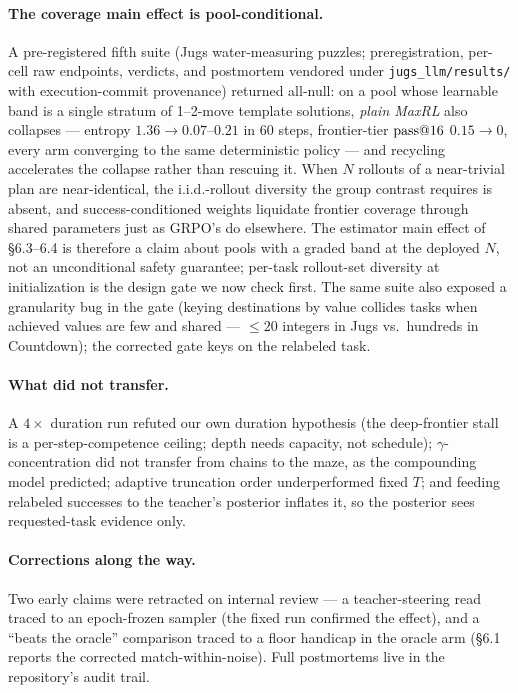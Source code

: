 \paragraph{The coverage main effect is pool-conditional.} A
pre-registered fifth suite (Jugs water-measuring puzzles;
preregistration, per-cell raw endpoints, verdicts, and postmortem
vendored under \texttt{jugs\_llm/results/} with execution-commit
provenance) returned all-null: on a pool whose
learnable band is a single stratum of 1--2-move template solutions,
\emph{plain MaxRL} also collapses --- entropy $1.36 \to 0.07$--$0.21$
in 60 steps, frontier-tier $\text{pass@}16$ $0.15 \to 0$, every arm
converging to the same deterministic policy --- and recycling
accelerates the collapse rather than rescuing it. When $N$ rollouts of
a near-trivial plan are near-identical, the i.i.d.-rollout diversity
the group contrast requires is absent, and success-conditioned weights
liquidate frontier coverage through shared parameters just as GRPO's
do elsewhere. The estimator main effect of \S 6.3--6.4 is therefore a
claim about pools with a graded band at the deployed $N$, not an
unconditional safety guarantee; per-task rollout-set diversity at
initialization is the design gate we now check first. The same suite
also exposed a granularity bug in the gate (keying destinations by
value collides tasks when achieved values are few and shared ---
$\le 20$ integers in Jugs vs.\ hundreds in Countdown); the corrected
gate keys on the relabeled task.

\paragraph{What did not transfer.} A $4\times$ duration run refuted
our own duration hypothesis (the deep-frontier stall is a
per-step-competence ceiling; depth needs capacity, not schedule);
$\gamma$-concentration did not transfer from chains to the maze,
as the compounding model predicted; adaptive truncation order
underperformed fixed $T$; and feeding relabeled successes to the
teacher's posterior inflates it, so the posterior sees requested-task
evidence only.

\paragraph{Corrections along the way.} Two early claims were retracted
on internal review --- a teacher-steering read traced to an
epoch-frozen sampler (the fixed run confirmed the effect), and a
``beats the oracle'' comparison traced to a floor handicap in the
oracle arm (\S 6.1 reports the corrected match-within-noise). Full
postmortems live in the repository's audit trail.


